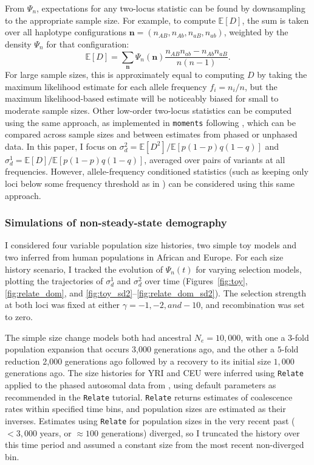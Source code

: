 \documentclass[]{article}
\newcommand{\E}{\mathbb{E}}
\begin{document}
From \(\Psi_n\), expectations for any two-locus statistic can be found by
downsampling to the appropriate sample size. For example, to compute \(\E[D]\),
the sum is taken over all haplotype configurations \(\mathbf{n} = (n_{AB}, n_{Ab}, n_{aB}, n_{ab})\), weighted by the density \(\Psi_n\) for that
configuration:
\begin{equation}
\E[D] = \sum_{\mathbf{n}} \Psi_n(\mathbf{n})
\frac{n_{AB}n_{ab} - n_{Ab}n_{aB}}{n(n-1)}.
\end{equation}
For large sample sizes, this is approximately equal to computing \(D\) by
taking the maximum likelihood estimate for each allele frequency \(f_i = n_i /
n\), but the maximum likelihood-based estimate will be noticeably biased for
small to moderate sample sizes. Other low-order two-locus statistics can be
computed using the same approach, as implemented in \texttt{moments} following
\citet{Ragsdale2020-nz}, which can be compared across sample sizes and between
estimates from phased or unphased data. In this paper, I focus on \(\sigma_d^2
= \E[D^2] / \E[p(1-p)q(1-q)]\) and \(\sigma_d^1 = \E[D] / \E[p(1-p)q(1-q)]\),
averaged over pairs of variants at all frequencies. However, allele-frequency
conditioned statistics (such as keeping only loci below some frequency
threshold as in \citet{Good2022-ot}) can be considered using this same
approach.

\subsubsection{Simulations of non-steady-state demography}

I considered four variable population size histories, two simple toy models and
two inferred from human populations in African and Europe. For each size
history scenario, I tracked the evolution of \(\Psi_n(t)\) for varying
selection models, plotting the trajectories of \(\sigma_d^1\) and
\(\sigma_d^2\) over time (Figures~\ref{fig:toy}, \ref{fig:relate_dom}, and
\ref{fig:toy_sd2}--\ref{fig:relate_dom_sd2}). The selection strength at both
loci was fixed at either \(\gamma=-1, -2, and -10\), and recombination was set
to zero.

The simple size change models both had ancestral \(N_e=10,000\), with one a
\(3\)-fold population expansion that occurs 3,000 generations ago, and the
other a \(5\)-fold reduction 2,000 generations ago followed by a recovery to
its initial size \(1,000\) generations ago. The size histories for YRI and CEU
were inferred using \texttt{Relate} \citep{Speidel2019-nj} applied to the
phased autosomal data from \citet{1000_Genomes_Project_Consortium2015-zq},
using default parameters as recommended in the \texttt{Relate} tutorial.
\texttt{Relate} returns estimates of coalescence rates within specified time
bins, and population sizes are estimated as their inverses. Estimates using
\texttt{Relate} for population sizes in the very recent past (\(<3,000\) years,
or \(\approx 100\) generations) diverged, so I truncated the history over this
time period and assumed a constant size from the most recent non-diverged bin.
\end{document}
